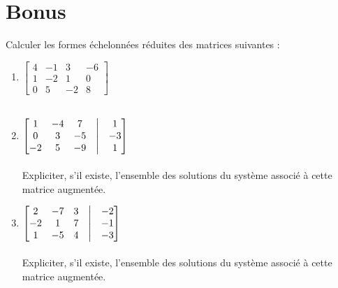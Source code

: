 \section*{Bonus}
\begin{exercice}
Calculer les formes échelonnées réduites des matrices suivantes :
\begin{enumerate}
    \item $\begin{bmatrix}
    4 & -1 & 3 & -6\\
    1 & -2 & 1 & 0\\
    0 & 5 & -2 & 8
    \end{bmatrix}$ \\
    \, \\
    
    \item $\begin{bmatrix}
    1 & -4 & 7 & \bigm| & 1 \\
    0 & 3 & -5 & \bigm| & -3 \\
    -2 & 5 & -9 & \bigm| & 1
    \end{bmatrix}$ \\
    \, \\
    Expliciter, s'il existe, l'ensemble des solutions du système associé à cette matrice augmentée. \\
    
    \item $\begin{bmatrix}
    2 & -7 & 3 & \bigm| & -2 \\
    -2 & 1 & 7 & \bigm| & -1 \\
    1 & -5 & 4 & \bigm| & -3
    \end{bmatrix}$ \\
    \, \\
    Expliciter, s'il existe, l'ensemble des solutions du système associé à cette matrice augmentée. \\
\end{enumerate}
\end{exercice}
